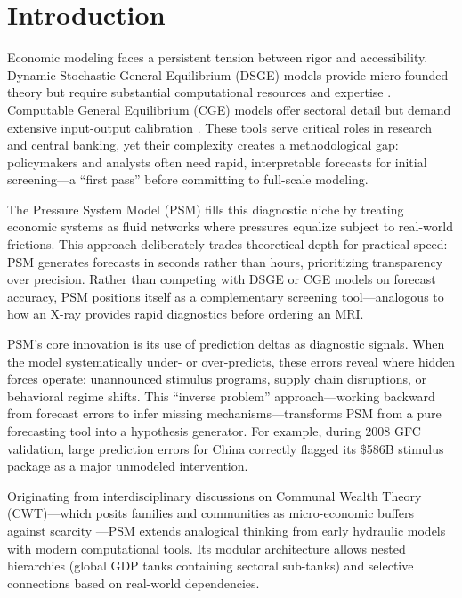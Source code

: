 \documentclass[11pt]{article}
\begin{document}
\section{Introduction}
Economic modeling faces a persistent tension between rigor and accessibility. Dynamic Stochastic General Equilibrium (DSGE) models provide micro-founded theory but require substantial computational resources and expertise \citep{christiano2018dsge, delnegro2013dsge}. Computable General Equilibrium (CGE) models offer sectoral detail but demand extensive input-output calibration \citep{dixon2013validation, kehoe2005general}. These tools serve critical roles in research and central banking, yet their complexity creates a methodological gap: policymakers and analysts often need rapid, interpretable forecasts for initial screening---a ``first pass'' before committing to full-scale modeling.

The Pressure System Model (PSM) fills this diagnostic niche by treating economic systems as fluid networks where pressures equalize subject to real-world frictions. This approach deliberately trades theoretical depth for practical speed: PSM generates forecasts in seconds rather than hours, prioritizing transparency over precision. Rather than competing with DSGE or CGE models on forecast accuracy, PSM positions itself as a complementary screening tool---analogous to how an X-ray provides rapid diagnostics before ordering an MRI.

PSM's core innovation is its use of prediction deltas as diagnostic signals. When the model systematically under- or over-predicts, these errors reveal where hidden forces operate: unannounced stimulus programs, supply chain disruptions, or behavioral regime shifts. This ``inverse problem'' approach---working backward from forecast errors to infer missing mechanisms---transforms PSM from a pure forecasting tool into a hypothesis generator. For example, during 2008 GFC validation, large prediction errors for China correctly flagged its \$586B stimulus package as a major unmodeled intervention.

Originating from interdisciplinary discussions on Communal Wealth Theory (CWT)---which posits families and communities as micro-economic buffers against scarcity \citep{mcentire2025communal, lewis1966culture}---PSM extends analogical thinking from early hydraulic models \citep{phillips1950mechanical, colander2008moniac} with modern computational tools. Its modular architecture allows nested hierarchies (global GDP tanks containing sectoral sub-tanks) and selective connections based on real-world dependencies.
\end{document}
